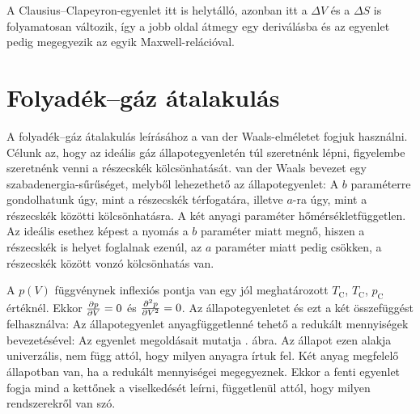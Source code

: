   A Clausius--Clapeyron-egyenlet itt is helytálló, azonban itt a $\Delta V$ és a $\Delta S$ is folyamatosan változik, így a jobb oldal átmegy egy deriválásba és az egyenlet pedig megegyezik az egyik Maxwell-relációval.
  
  \section{Folyadék--gáz átalakulás}\label{ss:B09-vdW}
   
   A folyadék--gáz átalakulás leírásához a van der Waals-elméletet fogjuk használni. Célunk az, hogy az ideális gáz állapotegyenletén túl szeretnénk lépni, figyelembe szeretnénk venni a részecskék kölcsönhatását. van der Waals bevezet egy szabadenergia-sűrűséget, melyből lehezethető az állapotegyenlet:
   A $b$ paraméterre gondolhatunk úgy, mint a részecskék térfogatára, illetve $a$-ra úgy, mint a részecskék közötti kölcsönhatásra. A két anyagi paraméter hőmérsékletfüggetlen. Az ideális esethez képest a nyomás a $b$ paraméter miatt megnő, hiszen a részecskék is helyet foglalnak ezenúl, az $a$ paraméter miatt pedig csökken, a részecskék között vonzó kölcsönhatás van. 
   
   A $p(V)$ függvénynek inflexiós pontja van egy jól meghatározott $T_\text{C}$, $T_\text{C}$, $p_\text{C}$ értéknél. Ekkor $\frac{\partial p}{\partial V}=0$ és $\frac{\partial ^2p}{\partial V^2}=0$. Az állapotegyenletet és ezt a két összefüggést felhasználva:
   Az állapotegyenlet anyagfüggetlenné tehető a redukált mennyiségek bevezetésével:
   Az egyenlet megoldásait mutatja . ábra. Az állapot ezen alakja univerzális, nem függ attól, hogy milyen anyagra írtuk fel. Két anyag megfelelő állapotban van, ha a redukált mennyiségei megegyeznek. Ekkor a fenti egyenlet fogja mind a kettőnek a viselkedését leírni, függetlenül attól, hogy milyen rendszerekről van szó.
   

